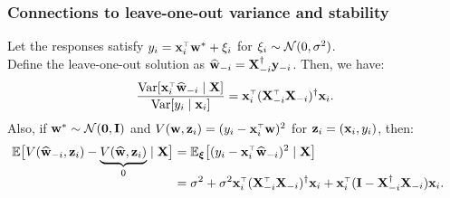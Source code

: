 \documentclass[10pt]{beamer}
\begin{document}
\begin{frame}
  \frametitle{Connections to leave-one-out variance and stability}
  Let the responses satisfy $y_i = \x_i^\top\w^*+\xi_i$ for
  $\xi_i\sim\mathcal{N}(0,\sigma^2)$.\\
  Define the leave-one-out solution as
  $\widehat{\mathbf w}_{-i}=\mathbf X_{-i}^\dagger\mathbf y_{-i}$. Then, we have:
  \begin{align*}
\frac{\Var[\x_i^\top\wbh_{-i}\mid \X]}{\Var[y_i\mid \x_i]} = \x_i^\top(\X_{-i}^\top\X_{-i})^\dagger\x_i.
  \end{align*}
Also, if $\mathbf w^*\sim\mathcal{N}(\mathbf 0,\mathbf I)$ and
  $V(\w,\z_i)=(y_i-\x_i^\top\w)^2$ for $\mathbf z_i=(\mathbf x_i,y_i)$, then:
  \begin{align*}
    \hspace{-4mm}\E\big[V(\wbh_{-i},\z_i) -\underbrace{ V(\wbh,\z_i)}_{0}\mid \X\big]
    & =     \E_{\xib}\big[(y_i-\x_i^\top\wbh_{-i})^2 \mid \X\big]
    \\[-2mm]
&= \sigma^2 + \sigma^2\x_i^\top(\X_{-i}^\top\X_{-i})^\dagger\x_i + \x_i^\top(\I-\X_{-i}^\dagger\X_{-i})\x_i.
  \end{align*}
\end{frame}



\end{document}
